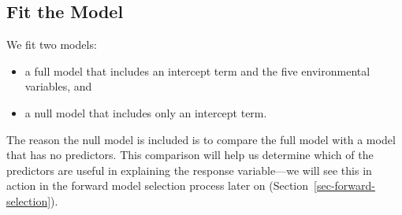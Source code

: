 \documentclass[
  letterpaper,
]{book}
\newenvironment{Shaded}{\begin{snugshade}}{\end{snugshade}}
\newcommand{\AttributeTok}[1]{\textcolor[rgb]{0.40,0.45,0.13}{#1}}
\newcommand{\CommentTok}[1]{\textcolor[rgb]{0.37,0.37,0.37}{#1}}
\newcommand{\DecValTok}[1]{\textcolor[rgb]{0.68,0.00,0.00}{#1}}
\newcommand{\FunctionTok}[1]{\textcolor[rgb]{0.28,0.35,0.67}{#1}}
\newcommand{\NormalTok}[1]{\textcolor[rgb]{0.00,0.23,0.31}{#1}}
\newcommand{\OtherTok}[1]{\textcolor[rgb]{0.00,0.23,0.31}{#1}}
\newcommand{\SpecialCharTok}[1]{\textcolor[rgb]{0.37,0.37,0.37}{#1}}
\newcommand{\StringTok}[1]{\textcolor[rgb]{0.13,0.47,0.30}{#1}}
\providecommand{\tightlist}{%
  \setlength{\itemsep}{0pt}\setlength{\parskip}{0pt}}\usepackage{longtable,booktabs,array}
\begin{document}
\subsection{Fit the Model}\label{fit-the-model}

We fit two models:

\begin{itemize}
\tightlist
\item
  a full model that includes an intercept term and the five
  environmental variables, and
\item
  a null model that includes only an intercept term.
\end{itemize}

The reason the null model is included is to compare the full model with
a model that has no predictors. This comparison will help us determine
which of the predictors are useful in explaining the response
variable---we will see this in action in the forward model selection
process later on (Section~\ref{sec-forward-selection}).

\begin{Shaded}
\end{Shaded}
\end{document}
